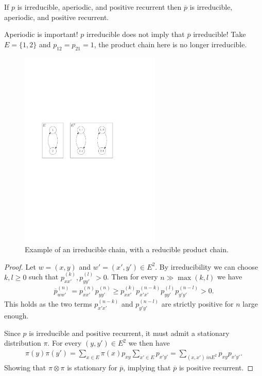 \begin{prop}[]
	If $p$ is irreducible, aperiodic, and positive recurrent then $\overline{p}$ is irreducible, aperiodic, and positive recurrent.
\end{prop}


\begin{rmk}[]
	Aperiodic is important!  $p$ irreducible does not imply that $\overline{p}$ irreducible! Take $E = \{1,2\}$ and $p_{12} = p_{21}=1$, the product chain here is no longer irreducible.
\end{rmk}

\begin{figure}[h!]
\centering
\includegraphics[width=0.6\textwidth]{figures/non_irred_prod_chain.pdf}
\caption{Example of an irreducible chain, with a reducible product chain.}
\end{figure}

\begin{proof}
	Let $w=(x,y)$ and $w'=(x',y') \in E^2$. By irreducibility we can choose $k,l\geq 0$ such that $p_{xx'}^{(k)}, p_{yy'}^{(l)} >0$. Then for every $n \gg \max(k,l)$ we have
\begin{align}
	\overline{p}_{ww'}^{(n)} = p_{xx'}^{(n)}p_{yy'}^{(n)} \geq p_{xx'}^{(k)}p_{x'x'}^{(n-k)} p_{yy'}^{(l)} p_{y'y'}^{(n-l)} > 0.
\end{align}
This holds as the two terms $p_{x'x'}^{(n-k)}$ and $p_{y'y'}^{(n-l)}$ are strictly positive for $n$ large enough.

	Since $p$ is irreducible and positive recurrent, it must admit a stationary distribution $\pi $. For every $(y,y')\in E^2$ we then have
\begin{align}
	\pi (y) \pi (y') = \sum_{x \in E}^{} \pi(x)p_{xy} \sum_{x' \in E}^{}p_{x'y'} = \sum_{(x,x')\ in E^2}^{} p_{xy}p_{x'y'}. 
\end{align}
Showing that $\pi \otimes \pi $ is stationary for $\overline{p}$, implying that $\overline{p}$ is positive recurrent.
\end{proof}

